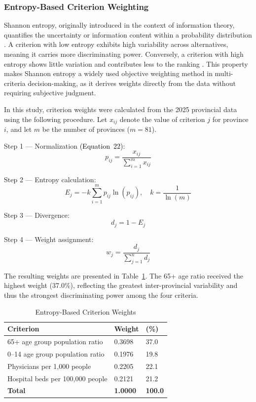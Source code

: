 \documentclass[final, 9pt, twocolumn]{saucis}
\newcommand{\rev}[1]{\textcolor{black}{#1}}
\begin{document}
\subsubsection{Entropy-Based Criterion Weighting}

Shannon entropy, originally introduced in the context of information theory, quantifies the uncertainty or information content within a probability distribution \cite{result5, result6}. A criterion with low entropy exhibits high variability across alternatives, meaning it carries more discriminating power. Conversely, a criterion with high entropy shows little variation and contributes less to the ranking \cite{result7}. This property makes Shannon entropy a widely used objective weighting method in multi-criteria decision-making, as it derives weights directly from the data without requiring subjective judgment.

In this study, criterion weights were calculated from the 2025 provincial data using the following procedure. Let $x_{ij}$ denote the value of criterion $j$ for province $i$, and let $m$ be the number of provinces ($m = 81$).

Step 1 — Normalization \rev{(Equation~22)}:
\begin{equation}
p_{ij} = \frac{x_{ij}}{\sum_{i=1}^{m} x_{ij}}
\end{equation}

Step 2 — Entropy calculation:
\begin{equation}
E_j = -k \sum_{i=1}^{m} p_{ij} \ln(p_{ij}), \quad k = \frac{1}{\ln(m)}
\end{equation}

Step 3 — Divergence:
\begin{equation}
d_j = 1 - E_j
\end{equation}

Step 4 — Weight assignment:
\begin{equation}
w_j = \frac{d_j}{\sum_{j=1}^{n} d_j}
\end{equation}

The resulting weights are presented in Table~\ref{tab:topsis_weights}. The 65+ age ratio received the highest weight (37.0\%), reflecting the greatest inter-provincial variability and thus the strongest discriminating power among the four criteria.

\begin{table}[h]
\centering
\caption{Entropy-Based Criterion Weights}
\label{tab:topsis_weights}
\begin{tabular}{p{4.5cm} p{1.5cm} p{1cm}}
\hline
\textbf{Criterion} & \textbf{Weight} & \textbf{(\%)} \\
\hline
65+ age group population ratio   & 0.3698 & 37.0 \\
0--14 age group population ratio & 0.1976 & 19.8 \\
Physicians per 1,000 people         & 0.2205 & 22.1 \\
Hospital beds per 100,000 people & 0.2121 & 21.2 \\
\hline
\textbf{Total}                   & \textbf{1.0000} & \textbf{100.0} \\
\hline
\end{tabular}
\end{table}
\end{document}
